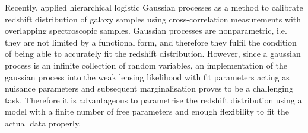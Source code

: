 \documentclass{aa}
\begin{document}
 Recently, \cite{2020MNRAS.491.4768R} applied hierarchical logistic Gaussian processes as a method to calibrate redshift distribution of galaxy samples using cross-correlation measurements with overlapping spectroscopic samples. Gaussian processes are nonparametric, i.e. they are not limited by a functional form, and therefore they fulfil the condition of being able to accurately fit the redshift distribution. However, since a gaussian process is an infinite collection of random variables, an implementation of the gaussian process into the weak lensing likelihood with fit parameters acting as nuisance parameters and subsequent marginalisation proves to be a challenging task. Therefore it is advantageous to parametrise the redshift distribution using a model with a finite number of free parameters and enough flexibility to fit the actual data properly.
\end{document}
